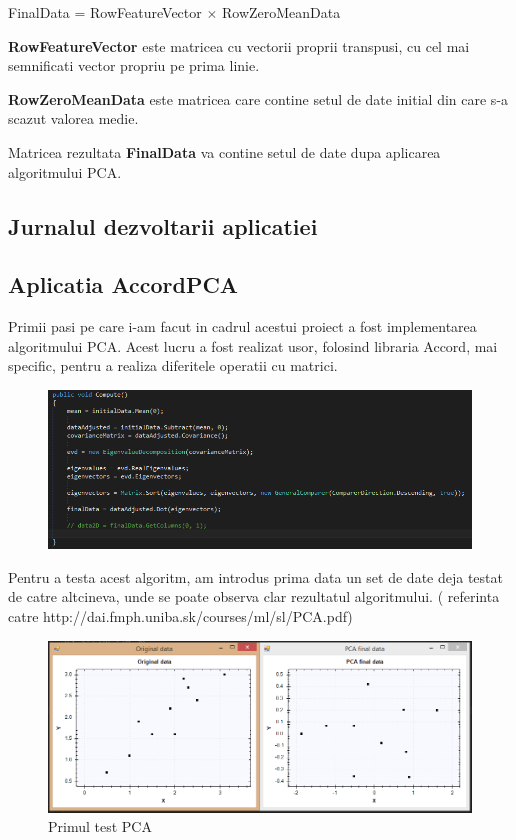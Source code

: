 \documentclass[12pt]{article}
\begin{document}
FinalData = RowFeatureVector $\times$ RowZeroMeanData

\textbf{RowFeatureVector} este matricea cu vectorii proprii transpusi, cu cel mai semnificati vector propriu pe prima linie.

\textbf{RowZeroMeanData} este matricea care contine setul de date initial din care s-a scazut valorea medie.

Matricea rezultata \textbf{FinalData} va contine setul de date dupa aplicarea algoritmului PCA.
\newpage

\subsection{Jurnalul dezvoltarii aplicatiei}

\subsection{Aplicatia AccordPCA}
Primii pasi pe care i-am facut in cadrul acestui proiect a fost implementarea algoritmului PCA. Acest lucru a fost realizat usor, folosind libraria Accord, mai specific, pentru a realiza diferitele operatii cu matrici. 

\begin{figure}[H]
\centering
\includegraphics[width=\linewidth]{Compute}
\end{figure}

Pentru a testa acest algoritm, am introdus prima data un set de date deja testat de catre altcineva, unde se poate observa clar rezultatul algoritmului. ( referinta catre http://dai.fmph.uniba.sk/courses/ml/sl/PCA.pdf) 
\begin{figure}[H]
\centering
\caption{Primul test PCA}
\includegraphics[width=\linewidth]{Test1}
\end{figure}
\newpage
\end{document}
